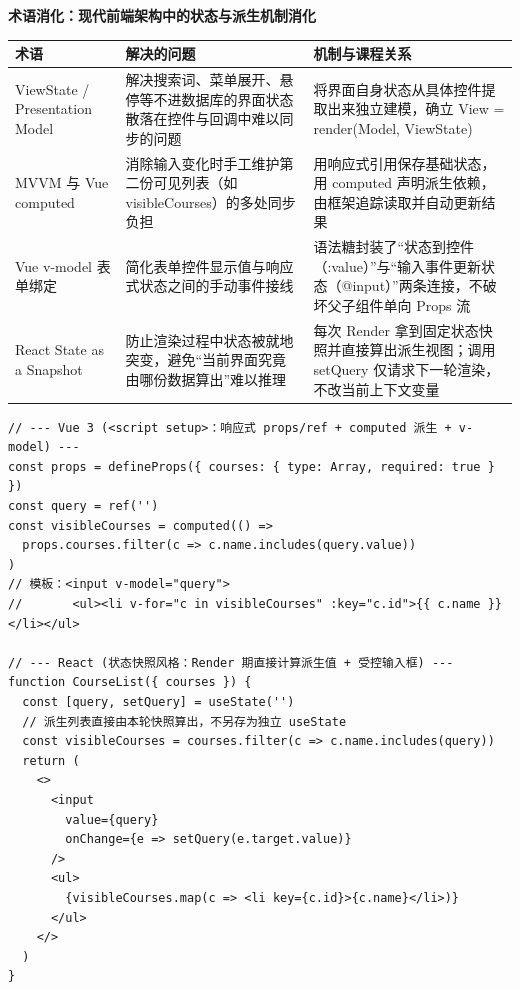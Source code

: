 \documentclass[UTF8,a4paper,11pt,fontset=fandol]{ctexart}
\begin{document}
\par{}\textbf{术语消化：现代前端架构中的状态与派生机制消化}

\begin{center}\small\begin{tabularx}{\linewidth}{YYY}

\toprule

术语 & 解决的问题 & 机制与课程关系\\\midrule

ViewState / Presentation Model & 解决搜索词、菜单展开、悬停等不进数据库的界面状态散落在控件与回调中难以同步的问题 & 将界面自身状态从具体控件提取出来独立建模，确立 View = render(Model, ViewState)\\[3pt]

MVVM 与 Vue computed & 消除输入变化时手工维护第二份可见列表（如 visibleCourses）的多处同步负担 & 用响应式引用保存基础状态，用 computed 声明派生依赖，由框架追踪读取并自动更新结果\\[3pt]

Vue v-model 表单绑定 & 简化表单控件显示值与响应式状态之间的手动事件接线 & 语法糖封装了“状态到控件（:value）”与“输入事件更新状态（@input）”两条连接，不破坏父子组件单向 Props 流\\[3pt]

React State as a Snapshot & 防止渲染过程中状态被就地突变，避免“当前界面究竟由哪份数据算出”难以推理 & 每次 Render 拿到固定状态快照并直接算出派生视图；调用 setQuery 仅请求下一轮渲染，不改当前上下文变量\\[3pt]

\bottomrule\end{tabularx}\end{center}

\begin{lstlisting}[basicstyle={\ttfamily\small\linespread{1}\selectfont},captionpos=t,caption={同一个课程列表筛选：Vue 响应式派生对比 React 状态快照渲染}]
// --- Vue 3 (<script setup>：响应式 props/ref + computed 派生 + v-model) ---
const props = defineProps({ courses: { type: Array, required: true } })
const query = ref('')
const visibleCourses = computed(() =>
  props.courses.filter(c => c.name.includes(query.value))
)
// 模板：<input v-model="query">
//       <ul><li v-for="c in visibleCourses" :key="c.id">{{ c.name }}</li></ul>

// --- React (状态快照风格：Render 期直接计算派生值 + 受控输入框) ---
function CourseList({ courses }) {
  const [query, setQuery] = useState('')
  // 派生列表直接由本轮快照算出，不另存为独立 useState
  const visibleCourses = courses.filter(c => c.name.includes(query))
  return (
    <>
      <input
        value={query}
        onChange={e => setQuery(e.target.value)}
      />
      <ul>
        {visibleCourses.map(c => <li key={c.id}>{c.name}</li>)}
      </ul>
    </>
  )
}
\end{lstlisting}
\end{document}
